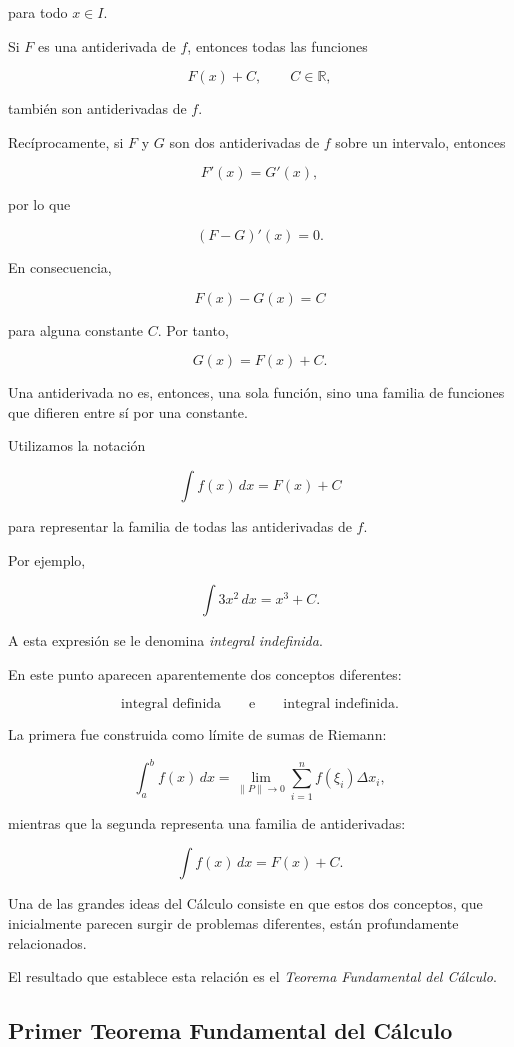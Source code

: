 \documentclass[12pt]{article}
\begin{document}
para todo $x\in I$.

Si $F$ es una antiderivada de $f$, entonces todas las funciones

\[
F(x)+C,
\qquad C\in\mathbb{R},
\]

también son antiderivadas de $f$.

Recíprocamente, si $F$ y $G$ son dos antiderivadas de $f$ sobre un
intervalo, entonces

\[
F'(x)=G'(x),
\]

por lo que

\[
(F-G)'(x)=0.
\]

En consecuencia,

\[
F(x)-G(x)=C
\]

para alguna constante $C$. Por tanto,

\[
\boxed{
G(x)=F(x)+C.
}
\]

Una antiderivada no es, entonces, una sola función, sino una familia de
funciones que difieren entre sí por una constante.

Utilizamos la notación

\[
\boxed{
\int f(x)\,dx=F(x)+C
}
\]

para representar la familia de todas las antiderivadas de $f$.

Por ejemplo,

\[
\boxed{
\int 3x^2\,dx=x^3+C.
}
\]

A esta expresión se le denomina \emph{integral indefinida}.

En este punto aparecen aparentemente dos conceptos diferentes:

\[
\text{integral definida}
\qquad\text{e}\qquad
\text{integral indefinida}.
\]

La primera fue construida como límite de sumas de Riemann:

\[
\int_a^b f(x)\,dx
=
\lim_{\|P\|\to0}
\sum_{i=1}^{n}f(\xi_i)\Delta x_i,
\]

mientras que la segunda representa una familia de antiderivadas:

\[
\int f(x)\,dx=F(x)+C.
\]

Una de las grandes ideas del Cálculo consiste en que estos dos conceptos,
que inicialmente parecen surgir de problemas diferentes, están
profundamente relacionados.

El resultado que establece esta relación es el
\emph{Teorema Fundamental del Cálculo}.

\subsection{Primer Teorema Fundamental del Cálculo}
\end{document}
